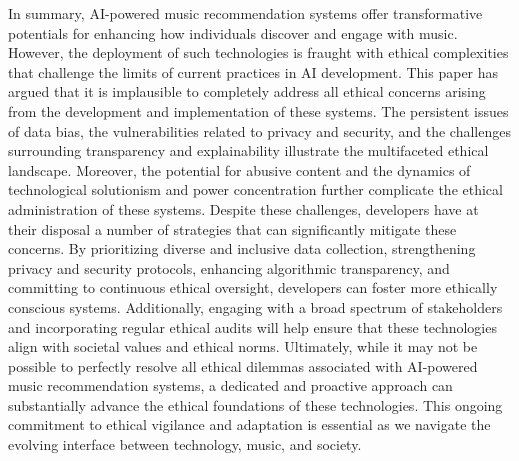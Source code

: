 \documentclass[10pt,twocolumn]{article}
\begin{document}
In summary, AI-powered music recommendation systems offer transformative potentials for enhancing how individuals discover and engage with music. However, the deployment of such technologies is fraught with ethical complexities that challenge the limits of current practices in AI development. This paper has argued that it is implausible to completely address all ethical concerns arising from the development and implementation of these systems. The persistent issues of data bias, the vulnerabilities related to privacy and security, and the challenges surrounding transparency and explainability illustrate the multifaceted ethical landscape. Moreover, the potential for abusive content and the dynamics of technological solutionism and power concentration further complicate the ethical administration of these systems. Despite these challenges, developers have at their disposal a number of strategies that can significantly mitigate these concerns. By prioritizing diverse and inclusive data collection, strengthening privacy and security protocols, enhancing algorithmic transparency, and committing to continuous ethical oversight, developers can foster more ethically conscious systems. Additionally, engaging with a broad spectrum of stakeholders and incorporating regular ethical audits will help ensure that these technologies align with societal values and ethical norms. Ultimately, while it may not be possible to perfectly resolve all ethical dilemmas associated with AI-powered music recommendation systems, a dedicated and proactive approach can substantially advance the ethical foundations of these technologies. This ongoing commitment to ethical vigilance and adaptation is essential as we navigate the evolving interface between technology, music, and society.






\printbibliography
\end{document}
